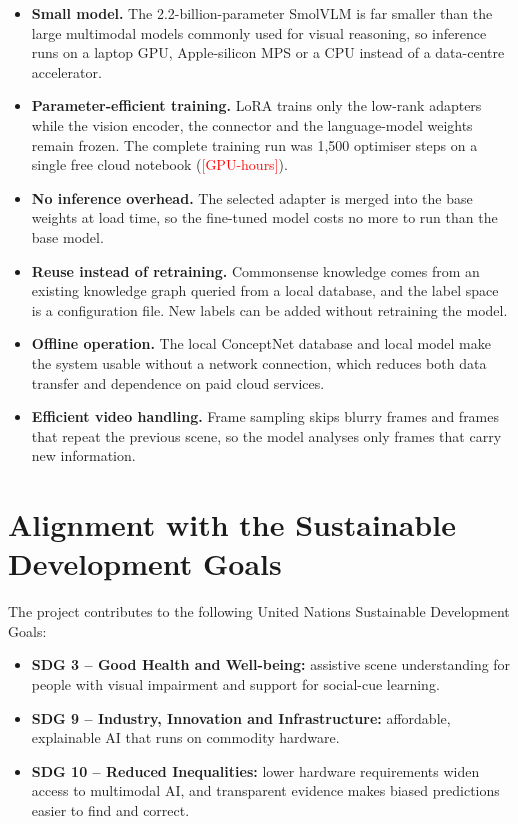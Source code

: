 \documentclass[12pt,a4paper,oneside]{report}
\newcommand{\fillin}[1]{\textcolor{red}{[#1]}}
\begin{document}
\begin{itemize}[leftmargin=*]
\item \textbf{Small model.} The 2.2-billion-parameter SmolVLM is far smaller
  than the large multimodal models commonly used for visual reasoning, so
  inference runs on a laptop GPU, Apple-silicon MPS or a CPU instead of a
  data-centre accelerator.
\item \textbf{Parameter-efficient training.} LoRA trains only the low-rank
  adapters while the vision encoder, the connector and the language-model
  weights remain frozen. The complete training run was 1,500 optimiser steps on
  a single free cloud notebook (\fillin{GPU-hours}).
\item \textbf{No inference overhead.} The selected adapter is merged into the
  base weights at load time, so the fine-tuned model costs no more to run than
  the base model.
\item \textbf{Reuse instead of retraining.} Commonsense knowledge comes from an
  existing knowledge graph queried from a local database, and the label space is
  a configuration file. New labels can be added without retraining the model.
\item \textbf{Offline operation.} The local ConceptNet database and local model
  make the system usable without a network connection, which reduces both data
  transfer and dependence on paid cloud services.
\item \textbf{Efficient video handling.} Frame sampling skips blurry frames and
  frames that repeat the previous scene, so the model analyses only frames that
  carry new information.
\end{itemize}

\section{Alignment with the Sustainable Development Goals}

The project contributes to the following United Nations Sustainable Development
Goals:

\begin{itemize}[leftmargin=*]
\item \textbf{SDG 3 -- Good Health and Well-being:} assistive scene
  understanding for people with visual impairment and support for social-cue
  learning.
\item \textbf{SDG 9 -- Industry, Innovation and Infrastructure:} affordable,
  explainable AI that runs on commodity hardware.
\item \textbf{SDG 10 -- Reduced Inequalities:} lower hardware requirements widen
  access to multimodal AI, and transparent evidence makes biased predictions
  easier to find and correct.
\end{itemize}
\end{document}
